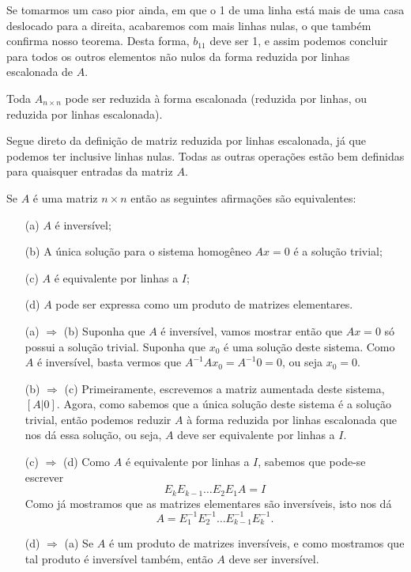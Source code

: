 Se tomarmos um caso pior ainda, em que o 1 de uma linha está mais de uma casa deslocado para a direita, acabaremos com mais linhas nulas, o que também confirma nosso teorema. Desta forma, $b_{11}$ deve ser 1, e assim podemos concluir para todos os outros elementos não nulos da forma reduzida por linhas escalonada de $A$.
\epr

\begin{coro}
   Toda $A_{n\times n}$ pode ser reduzida à forma escalonada (reduzida
por linhas, ou reduzida por linhas escalonada).
\end{coro}
\bpr
   Segue direto da definição de matriz reduzida por linhas escalonada, já que podemos ter inclusive linhas nulas. Todas as outras operações estão bem definidas para quaisquer entradas da matriz $A$.
\epr

\begin{teo}
   Se $A$ é uma matriz $n\times n$ então as seguintes afirmações são equivalentes:
   \begin{itemize}
      \item[(a)] $A$ é inversível;
      \item[(b)] A única solução para o sistema homogêneo $Ax=0$ é a solução trivial;
      \item[(c)] $A$ é equivalente por linhas a $I$; 
      \item[(d)] $A$ pode ser expressa como um produto de matrizes elementares.
   \end{itemize}
\end{teo}
\bpr
\begin{itemize}
   \item[(a) $\Rightarrow$ (b)] Suponha que $A$ é inversível, vamos mostrar então que $Ax=0$ só possui a solução trivial. Suponha que $x_0$ é uma solução deste sistema. Como $A$ é inversível, basta vermos que $A^{-1}Ax_0 = A^{-1}0 = 0$, ou seja $x_0 = 0$. 
   \item[(b) $\Rightarrow$ (c)] Primeiramente, escrevemos a matriz aumentada deste sistema, $[A | 0]$. Agora, como sabemos que a única solução deste sistema é a solução trivial, então podemos reduzir $A$ à forma reduzida por linhas escalonada que nos dá essa solução, ou seja, $A$ deve ser equivalente por linhas a $I$. 
   \item[(c) $\Rightarrow$ (d)] Como $A$ é equivalente por linhas a $I$, sabemos que pode-se escrever
   $$E_kE_{k-1}\ldots E_2E_1 A = I$$
   Como já mostramos que as matrizes elementares são inversíveis, isto nos dá
   $$A = E_1^{-1}E_2^{-1}\ldots E_{k-1}^{-1}E_k^{-1}.$$
   \item[(d) $\Rightarrow$ (a)] Se $A$ é um produto de matrizes inversíveis, e como mostramos que tal produto é inversível também, então $A$ deve ser inversível.
\end{itemize}
\epr

